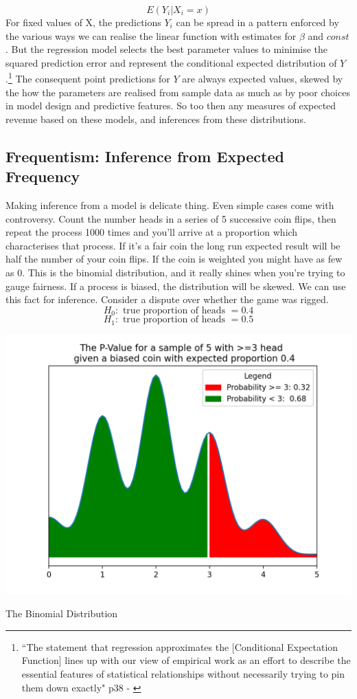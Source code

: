 \documentclass{tufte-handout}
\begin{document}
$$ E(Y_{i} | X_{i} = x )$$
For fixed values of X, the predictions $Y_{i}$ can be spread in a pattern enforced by the various ways we can realise the linear function with estimates for $\beta$ and $const$. But the regression model selects the best parameter values to minimise the squared prediction error and represent the conditional expected distribution of $Y$.\footnote{``The statement that regression approximates the [Conditional Expectation Function] lines up with our view of empirical work as an effort to describe the essential features of statistical relationships without necessarily trying to pin them down exactly" p38 - \cite{angrist_mostly_2008}} The consequent point predictions for $Y$ are always expected values, skewed by the how the parameters are realised from sample data as much as by poor choices in model design and predictive features. So too then any measures of expected revenue based on these models, and inferences from these distributions. 


\subsection{Frequentism: Inference from Expected Frequency}
Making inference from a model is delicate thing. Even simple cases come with controversy. Count the number heads in a series of 5 successive coin flips, then repeat the process 1000 times and you'll arrive at a proportion which characterises that process. If it's a fair coin the long run expected result will be half the number of your coin flips. If the coin is weighted you might have as few as 0. This is the binomial distribution, and it really shines when you're trying to gauge fairness. If a process is biased, the distribution will be skewed. We can use this fact for inference. Consider a dispute over whether the game was rigged. 
$$ H_0 : \text{ true proportion of heads } = 0.4  $$
$$ H_1 : \text{ true proportion of heads } =  0.5 $$

\begin{marginfigure}
  \includegraphics[width=\linewidth]{../Expectation/Plots/binomial_test.png}
  \caption{The Binomial Distribution}
\end{marginfigure}
\end{document}
